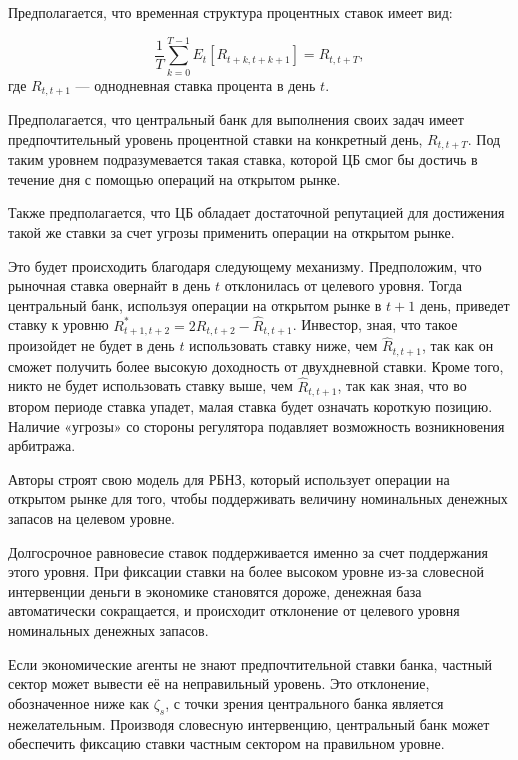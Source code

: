 \documentclass[14pt,a4paper, oneside]{extreport}
\begin{document}
Предполагается, что временная структура процентных ставок имеет вид:

\begin{equation}
\frac{1}{T} \sum_{k=0}^{T-1} E_t[R_{t+k,t+k+1}] =  R_{t,t+T},
\end{equation} где $R_{t,t+1}$ --- однодневная ставка процента в день $t$.

Предполагается, что центральный банк для выполнения своих задач имеет предпочтительный уровень процентной ставки на конкретный день, $R_{t,t+T}$. Под таким уровнем подразумевается такая ставка, которой ЦБ смог бы достичь в течение дня с помощью операций на открытом рынке. 

Также предполагается, что ЦБ обладает достаточной репутацией для достижения такой же ставки за счет угрозы применить операции на открытом рынке. 

Это будет происходить благодаря следующему механизму. Предположим, что рыночная ставка овернайт в день $t$ отклонилась от целевого уровня. Тогда центральный банк, используя операции на открытом рынке в $t+1$ день, 
приведет ставку к уровню $R^*_{t+1,t+2} = 2R_{t,t+2} - \hat R_{t,t+1}$. Инвестор, зная, что такое произойдет не будет в день $t$ использовать ставку ниже, чем $\hat R_{t,t+1}$, так как он сможет получить более высокую доходность от двухдневной ставки. Кроме того, никто не будет использовать ставку выше, чем $\hat R_{t,t+1}$, так как зная, что во втором периоде ставка упадет, малая ставка будет означать короткую позицию. Наличие «угрозы» со стороны регулятора подавляет возможность возникновения арбитража.  

Авторы строят свою модель для РБНЗ, который использует операции на открытом рынке для того, чтобы поддерживать величину номинальных денежных запасов на целевом уровне. 

Долгосрочное равновесие ставок поддерживается именно за счет поддержания этого уровня. При фиксации ставки на более высоком уровне из-за словесной интервенции деньги в экономике становятся дороже, денежная база автоматически сокращается, и происходит отклонение от целевого уровня номинальных денежных запасов.

Если экономические агенты не знают предпочтительной ставки банка, частный сектор может вывести её на неправильный уровень. Это отклонение, обозначенное ниже как  $\zeta_s$, с точки зрения центрального банка является нежелательным. Производя словесную интервенцию, центральный банк может обеспечить фиксацию ставки частным сектором на правильном уровне. 
\end{document}
